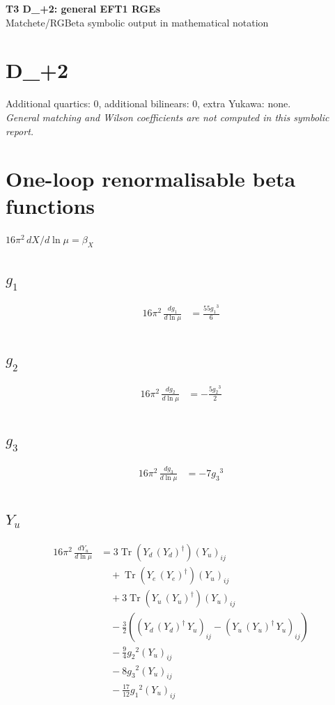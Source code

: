 \documentclass[10pt,a4paper]{article}
\begin{document}
\begin{center}
{\Large\bfseries T3 D\_+2: general EFT1 RGEs}\\[4pt]
Matchete/RGBeta symbolic output in mathematical notation
\end{center}
\bigskip
\section*{D\_+2}
Additional quartics: 0, additional bilinears: 0, extra Yukawa: none.\\
\emph{General matching and Wilson coefficients are not computed in this symbolic report.}
\clearpage
\section*{One-loop renormalisable beta functions}
$16\pi^2\,dX/d\ln\mu=\beta_X$
\subsection*{$g_1$}
\begin{align*}
16\pi^2\,\frac{d g_1}{d\ln\mu} &=\frac{55 {g_1}^3}{6} \\
\end{align*}
\subsection*{$g_2$}
\begin{align*}
16\pi^2\,\frac{d g_2}{d\ln\mu} &=-\frac{5 {g_2}^3}{2} \\
\end{align*}
\subsection*{$g_3$}
\begin{align*}
16\pi^2\,\frac{d g_3}{d\ln\mu} &=-7 {g_3}^3 \\
\end{align*}
\subsection*{$Y_u$}
\begin{align*}
16\pi^2\,\frac{d Y_u}{d\ln\mu} &=3 \operatorname{Tr}\!\left({Y_d}\,\left({Y_d}\right)^{\dagger}\right) \left({Y_u}\right)_{ij} \\
&\quad +\operatorname{Tr}\!\left({Y_e}\,\left({Y_e}\right)^{\dagger}\right) \left({Y_u}\right)_{ij} \\
&\quad +3 \operatorname{Tr}\!\left({Y_u}\,\left({Y_u}\right)^{\dagger}\right) \left({Y_u}\right)_{ij} \\
&\quad -\frac{3}{2} (\left({Y_d}\,\left({Y_d}\right)^{\dagger}\,{Y_u}\right)_{ij}-\left({Y_u}\,\left({Y_u}\right)^{\dagger}\,{Y_u}\right)_{ij}) \\
&\quad -\frac{9}{4} {g_2}^2 \left({Y_u}\right)_{ij} \\
&\quad -8 {g_3}^2 \left({Y_u}\right)_{ij} \\
&\quad -\frac{17}{12} {g_1}^2 \left({Y_u}\right)_{ij} \\
\end{align*}
\end{document}
